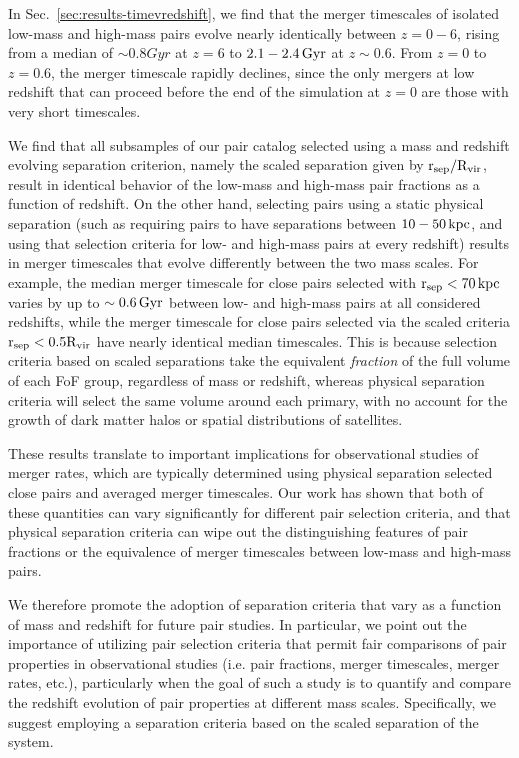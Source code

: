 \documentclass[twocolumn,linenumbers]{aastex631}
\begin{document}
            In Sec.~\ref{sec:results-timevredshift}, we find that the merger timescales of isolated low-mass and high-mass pairs evolve nearly identically between $z=0-6$, rising from a median of $\sim0.8Gyr$ at $z=6$ to $2.1-2.4\mathrm{\,Gyr}$ at $z\sim0.6$.
            From $z=0$ to $z=0.6$, the merger timescale rapidly declines, since the only mergers at low redshift that can proceed before the end of the simulation at $z=0$ are those with very short timescales.
        
            We find that all subsamples of our pair catalog selected using a mass and redshift evolving separation criterion, namely the scaled separation given by $\rm r_{sep}/\rm R_{vir}$, result in identical behavior of the low-mass and high-mass pair fractions as a function of redshift. 
            On the other hand, selecting pairs using a static physical separation (such as requiring pairs to have separations between $10-50\mathrm{\,kpc}$, and using that selection criteria for low- and high-mass pairs at every redshift) results in merger timescales that evolve differently between the two mass scales. 
            For example, the median merger timescale for close pairs selected with $\rm r_{sep}<70\mathrm{\,kpc}$ varies by up to $\sim0.6\mathrm{\,Gyr}$ between low- and high-mass pairs at all considered redshifts, while the merger timescale for close pairs selected via the scaled criteria $\rm r_{sep}<0.5\rm R_{vir}$ have nearly identical median timescales. 
            This is because selection criteria based on scaled separations take the equivalent \textit{fraction} of the full volume of each FoF group, regardless of mass or redshift, whereas physical separation criteria will select the same volume around each primary, with no account for the growth of dark matter halos or spatial distributions of satellites. 
            
            These results translate to important implications for observational studies of merger rates, which are typically determined using physical separation selected close pairs and averaged merger timescales. 
            Our work has shown that both of these quantities can vary significantly for different pair selection criteria, and that physical separation criteria can wipe out the distinguishing features of pair fractions or the equivalence of merger timescales between low-mass and high-mass pairs.
             
            We therefore promote the adoption of separation criteria that vary as a function of mass and redshift for future pair studies. 
            In particular, we point out the importance of utilizing pair selection criteria that permit fair comparisons of pair properties in observational studies (i.e. pair fractions, merger timescales, merger rates, etc.), particularly when the goal of such a study is to quantify and compare the redshift evolution of pair properties at different mass scales.
            Specifically, we suggest employing a separation criteria based on the scaled separation of the system. 
            
\end{document}

